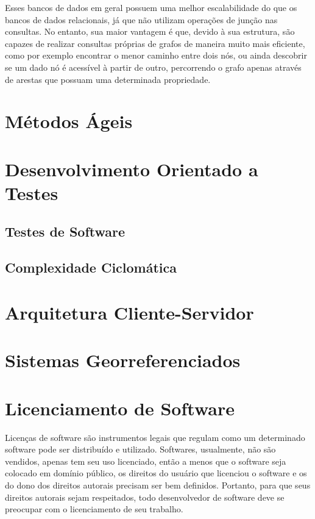 
Esses bancos de dados em geral possuem uma melhor escalabilidade do que os bancos de dados relacionais, já que não utilizam operações de junção nas consultas.
No entanto, sua maior vantagem é que, devido à sua estrutura, são capazes de realizar consultas próprias de grafos de maneira muito mais eficiente, como por exemplo encontrar o menor caminho entre dois nós, ou ainda descobrir se um dado nó é acessível à partir de outro, percorrendo o grafo apenas através de arestas que possuam uma determinada propriedade.


\section{Métodos Ágeis}

\section{Desenvolvimento Orientado a Testes}\label{fun:tdd}

\subsection{Testes de Software}

\subsection{Complexidade Ciclomática}

\section{Arquitetura Cliente-Servidor}

\section{Sistemas Georreferenciados}

\section{Licenciamento de Software}

Licenças de software são instrumentos legais que regulam como um determinado software pode ser distribuído e utilizado.
Softwares, usualmente, não são vendidos, apenas tem seu uso licenciado, então a menos que o software seja colocado em domínio público, os direitos do usuário que licenciou o software e os do dono dos direitos autorais precisam ser bem definidos. Portanto, para que seus direitos autorais sejam respeitados, todo desenvolvedor de software deve se preocupar com o licenciamento de seu trabalho.

